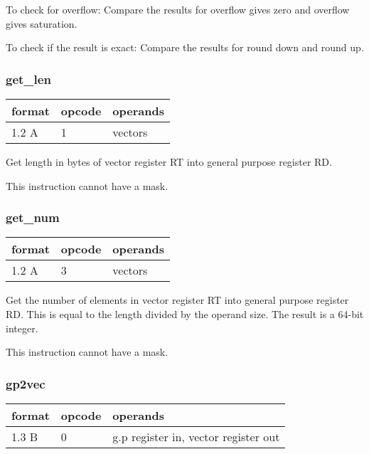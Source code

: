 \documentclass[forwardcom.tex]{subfiles}
\begin{document}
To check for overflow: Compare the results for overflow gives zero and overflow gives saturation. 

To check if the result is exact: Compare the results for round down and round up.


\subsubsection{get\_len}
\label{table:getLenInstruction}
\begin{tabular}{|p{12mm}|p{12mm}|p{110mm}|}
\hline
\bfseries format & \bfseries opcode & \bfseries operands \\ \hline
1.2 A & 1 & vectors  \\ \hline
\end{tabular}
\vspace{2mm}

Get length in bytes of vector register RT into general purpose register RD.
\vspace{2mm}

This instruction cannot have a mask.

\subsubsection{get\_num}
\label{table:getNumInstruction}
\begin{tabular}{|p{12mm}|p{12mm}|p{110mm}|}
\hline
\bfseries format & \bfseries opcode & \bfseries operands \\ \hline
1.2 A & 3 & vectors  \\ \hline
\end{tabular}
\vspace{2mm}

Get the number of elements in vector register RT into general purpose register RD. This is equal to the length divided by the operand size. The result is a 64-bit integer.
\vspace{2mm}

This instruction cannot have a mask.

\subsubsection{gp2vec}
\label{table:gp2vecInstruction}
\begin{tabular}{|p{12mm}|p{12mm}|p{110mm}|}
\hline
\bfseries format & \bfseries opcode & \bfseries operands \\ \hline
1.3 B & 0 & g.p register in, vector register out \\ \hline
\end{tabular}
\vspace{2mm}
\end{document}
